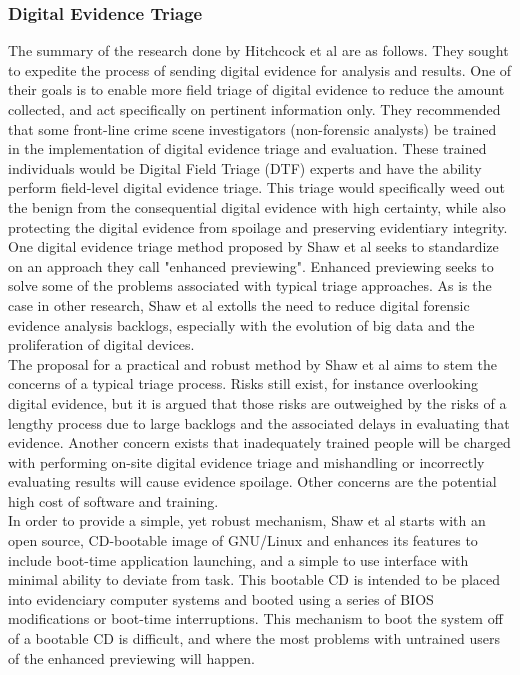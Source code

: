 \documentclass[12pt]{article}
\begin{document}
\subsubsection{Digital Evidence Triage}
The summary of the research done by Hitchcock et al\cite{hitchcock2016tiered} are as follows.  They sought to expedite
the process of sending digital evidence for analysis and results.  One of their goals is to enable more field triage
of digital evidence to reduce the amount collected, and act specifically on pertinent information only.  They 
recommended that some front-line crime scene investigators (non-forensic analysts) be trained in the implementation
of digital evidence triage and evaluation.  These trained individuals would be Digital Field Triage (DTF) experts and
have the ability perform field-level digital evidence triage.  This triage would specifically weed out the benign
from the consequential digital evidence with high certainty, while also protecting the digital evidence from spoilage
and preserving evidentiary integrity.\\

One digital evidence triage method proposed by Shaw et al\cite{shaw2013practical} seeks to standardize on an 
approach they call "enhanced previewing".  Enhanced previewing seeks to solve some of the problems associated with
typical triage approaches.  As is the case in other research, Shaw et al\cite{shaw2013practical} extolls the 
need to reduce digital forensic evidence analysis backlogs, especially with the evolution of big data and the
proliferation of digital devices.\\

The proposal for a practical and robust method by Shaw et al\cite{shaw2013practical} aims to stem the concerns
of a typical triage process.  Risks still exist, for instance overlooking digital evidence, but it is argued that
those risks are outweighed by the risks of a lengthy process due to large backlogs and the associated delays in
evaluating that evidence.  Another concern exists that inadequately trained people will be charged with performing
on-site digital evidence triage and mishandling or incorrectly evaluating results will cause evidence spoilage.
Other concerns are the potential high cost of software and training.\\

In order to provide a simple, yet robust mechanism, Shaw et al\cite{shaw2013practical} starts with an open source,
CD-bootable image of GNU/Linux and enhances its features to include boot-time application launching, and a simple
to use interface with minimal ability to deviate from task.  This bootable CD is intended to be placed into 
evidenciary computer systems and booted using a series of BIOS modifications or boot-time interruptions.  This 
mechanism to boot the system off of a bootable CD is difficult, and where the most problems with untrained users
of the enhanced previewing will happen.\\
\end{document}
